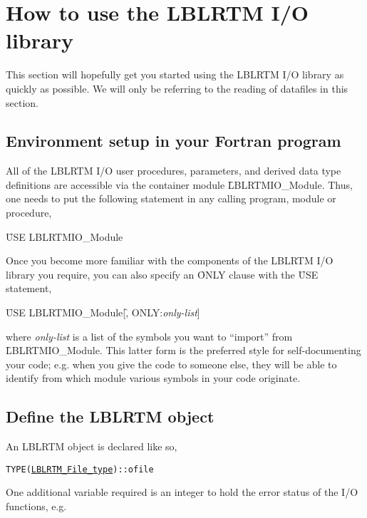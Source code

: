 \chapter{How to use the LBLRTM I/O library}
\label{chapter:use}

This section will hopefully get you started using the LBLRTM I/O library as quickly as possible. We will only be referring to the reading of datafiles in this section.


\section{Environment setup in your Fortran program}

All of the LBLRTM I/O user procedures, parameters, and derived data type definitions are accessible via the container module \f{LBLRTMIO\_Module}. Thus, one needs to put the following statement in any calling program, module or procedure,

\hspace{0.4cm}\f{USE LBLRTMIO\_Module}

Once you become more familiar with the components of the LBLRTM I/O library you require, you can also specify an \f{ONLY} clause with the \f{USE} statement,

\hspace{0.4cm}\f{USE LBLRTMIO\_Module}[\f{, ONLY:}\textit{only-list}]

where \textit{only-list} is a list of the symbols you want to ``import'' from \f{LBLRTMIO\_Module}. This latter form is the preferred style for self-documenting your code; e.g. when you give the code to someone else, they will be able to identify from which module various symbols in your code originate.



\section{Define the LBLRTM \File{} object}

An LBLRTM \File{} object is declared like so,
\begin{alltt}
  TYPE(\hyperref[fig:LBLRTM_File_type_structure]{LBLRTM_File_type}) :: ofile\end{alltt}

One additional variable required is an integer to hold the error status of the I/O functions, e.g. 

